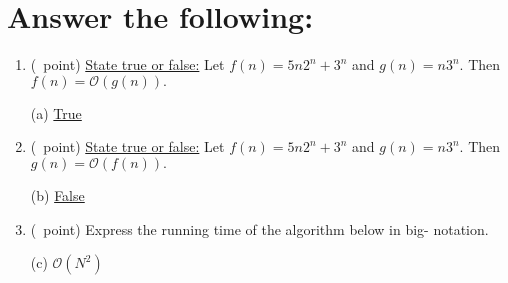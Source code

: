 \documentclass[14pt]{article}
\begin{document}
\section{Answer the following:}
\begin{enumerate}[label=\alph*)]
    \item (\textonequarter\ point) \underline{State true or false:} Let $f(n) = 5n2^{n} + 3^{n}$ and $g(n) = n3^{n}.$ Then $f(n) = \mathcal{O}(g(n)).$ \\ \vspace{1em}
    \begin{flushright}
    (a) \underline{\hspace{2cm}True\hspace{2cm}}
    \end{flushright}
    
    \item (\textonequarter\ point) \underline{State true or false:} Let $f(n) = 5n2^{n} + 3^{n}$ and $g(n) = n3^{n}.$ Then $g(n) = \mathcal{O}(f(n)).$ \\ \vspace{1em}
    \begin{flushright}
    (b) \underline{\hspace{2cm}False\hspace{2cm}}
    \end{flushright}
    
    \item (\textonequarter\ point) Express the running time of the algorithm below in big- notation. \\
    \begin{flushright}
    (c) \underline{\hspace{2cm}$\mathcal{O}(N^{2})$\hspace{2cm}}
    \end{flushright}
    

\end{enumerate}
\end{document}
